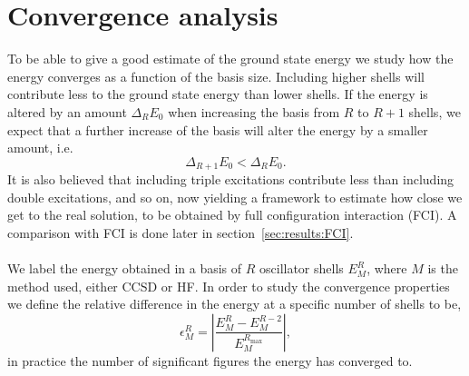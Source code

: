 \section{Convergence analysis}
To be able to give a good estimate of the ground state energy we study how the energy converges as a function of the basis size.
Including higher shells will contribute less to the ground state energy than lower shells.
If the energy is altered by an amount $\Delta_{R} E_0$ when increasing the basis from $R$ to $R+1$ shells, we expect that a further increase of the basis will alter the energy by a smaller amount, i.e.
\begin{equation}
\Delta_{R+1} E_0 < \Delta_{R} E_0 .
\end{equation}
It is also believed that including triple excitations contribute less than including double excitations, and so on, now yielding a framework to estimate how close we get to the real solution, to be obtained by full configuration interaction (FCI).
A comparison with FCI is done later in section~\ref{sec:results:FCI}.


\paragraph{}
We label the energy obtained in a basis of $R$ oscillator shells $E_{M}^{R}$, where $M$ is the method used, either CCSD or HF.
In order to study the convergence properties we define the relative difference in the energy at a specific number of shells to be,
\begin{equation}
\epsilon_M^R = \left| \frac{E_M^R - E_M^{R-2}}{E_M^{R_{\textrm{max}}}}  \right| , 
\end{equation}
in practice the number of significant figures the energy has converged to.


